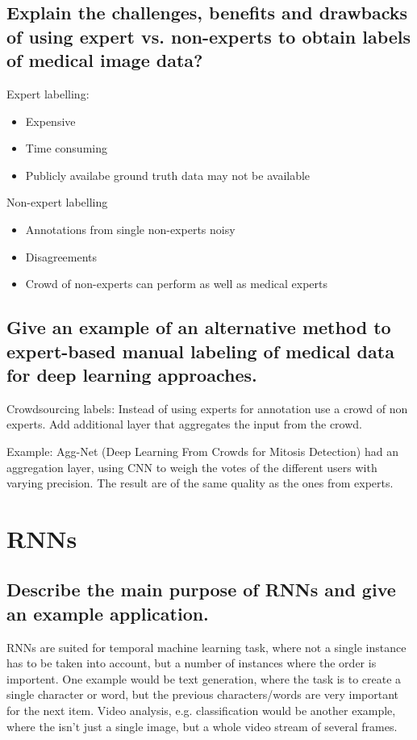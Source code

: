 \subsection{Explain the challenges, benefits and drawbacks of using expert vs. non-experts to obtain labels of medical image data?}
\begin{minipage}{0.5\textwidth}
Expert labelling:
\begin{itemize}
\item Expensive
\item Time consuming
\item Publicly availabe ground truth data may not be available
\end{itemize}
\end{minipage}
\begin{minipage}{0.5\textwidth}
Non-expert labelling
\begin{itemize}
\item Annotations from single non-experts noisy
\item Disagreements
\item Crowd of non-experts can perform as well as medical experts
\end{itemize}
\end{minipage}
\subsection{Give  an example of an alternative method to expert-based manual labeling of medical data for deep learning approaches.}
Crowdsourcing labels: Instead of using experts for annotation use a crowd of non experts. Add additional layer that aggregates the input from the crowd.

Example: Agg-Net (Deep Learning From Crowds for Mitosis Detection) had an aggregation layer, using CNN to weigh the votes of the different users with varying precision. The result are of the same quality as the ones from experts.
%
\section{RNNs}
\subsection{Describe the main purpose of RNNs and give an example application.}
RNNs are suited for temporal machine learning task, where not a single instance has to be taken into account, but a number of instances where the order is importent. One example would be text generation, where the task is to create a single character or word, but the previous characters/words are very important for the next item. Video analysis, e.g. classification would be another example, where the isn't just a single image, but a whole video stream of several frames.
